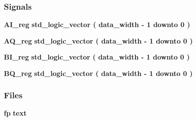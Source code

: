 \subsubsection*{Signals}
 \begin{DoxyCompactItemize}
\item 
{\bf A\+I\+\_\+reg} {\bfseries \textcolor{comment}{std\+\_\+logic\+\_\+vector}\textcolor{vhdlchar}{ }\textcolor{vhdlchar}{(}\textcolor{vhdlchar}{ }\textcolor{vhdlchar}{ }\textcolor{vhdlchar}{ }\textcolor{vhdlchar}{ }{\bfseries {\bf data\+\_\+width}} \textcolor{vhdlchar}{-\/}\textcolor{vhdlchar}{ } \textcolor{vhdldigit}{1} \textcolor{vhdlchar}{ }\textcolor{keywordflow}{downto}\textcolor{vhdlchar}{ }\textcolor{vhdlchar}{ } \textcolor{vhdldigit}{0} \textcolor{vhdlchar}{ }\textcolor{vhdlchar}{)}\textcolor{vhdlchar}{ }} 
\item 
{\bf A\+Q\+\_\+reg} {\bfseries \textcolor{comment}{std\+\_\+logic\+\_\+vector}\textcolor{vhdlchar}{ }\textcolor{vhdlchar}{(}\textcolor{vhdlchar}{ }\textcolor{vhdlchar}{ }\textcolor{vhdlchar}{ }\textcolor{vhdlchar}{ }{\bfseries {\bf data\+\_\+width}} \textcolor{vhdlchar}{-\/}\textcolor{vhdlchar}{ } \textcolor{vhdldigit}{1} \textcolor{vhdlchar}{ }\textcolor{keywordflow}{downto}\textcolor{vhdlchar}{ }\textcolor{vhdlchar}{ } \textcolor{vhdldigit}{0} \textcolor{vhdlchar}{ }\textcolor{vhdlchar}{)}\textcolor{vhdlchar}{ }} 
\item 
{\bf B\+I\+\_\+reg} {\bfseries \textcolor{comment}{std\+\_\+logic\+\_\+vector}\textcolor{vhdlchar}{ }\textcolor{vhdlchar}{(}\textcolor{vhdlchar}{ }\textcolor{vhdlchar}{ }\textcolor{vhdlchar}{ }\textcolor{vhdlchar}{ }{\bfseries {\bf data\+\_\+width}} \textcolor{vhdlchar}{-\/}\textcolor{vhdlchar}{ } \textcolor{vhdldigit}{1} \textcolor{vhdlchar}{ }\textcolor{keywordflow}{downto}\textcolor{vhdlchar}{ }\textcolor{vhdlchar}{ } \textcolor{vhdldigit}{0} \textcolor{vhdlchar}{ }\textcolor{vhdlchar}{)}\textcolor{vhdlchar}{ }} 
\item 
{\bf B\+Q\+\_\+reg} {\bfseries \textcolor{comment}{std\+\_\+logic\+\_\+vector}\textcolor{vhdlchar}{ }\textcolor{vhdlchar}{(}\textcolor{vhdlchar}{ }\textcolor{vhdlchar}{ }\textcolor{vhdlchar}{ }\textcolor{vhdlchar}{ }{\bfseries {\bf data\+\_\+width}} \textcolor{vhdlchar}{-\/}\textcolor{vhdlchar}{ } \textcolor{vhdldigit}{1} \textcolor{vhdlchar}{ }\textcolor{keywordflow}{downto}\textcolor{vhdlchar}{ }\textcolor{vhdlchar}{ } \textcolor{vhdldigit}{0} \textcolor{vhdlchar}{ }\textcolor{vhdlchar}{)}\textcolor{vhdlchar}{ }} 
\end{DoxyCompactItemize}
\subsubsection*{Files}
 \begin{DoxyCompactItemize}
\item 
{\bf fp} {\bfseries \textcolor{vhdlchar}{text}\textcolor{vhdlchar}{ }} 
\end{DoxyCompactItemize}


